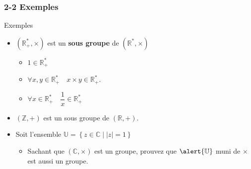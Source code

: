 \documentclass{beamer}
\begin{document}
\begin{frame}[<+->]
  \frametitle{2-2 Exemples}
 \begin{block}{Exemples}
   \begin{itemize}
     \item $\mathbf{\left(\mathbb{R}^{*}_+, \times\right)}$ est un \textbf{sous groupe}  de
       $\left(\mathbb{R}^{*}, \times\right)$
       \begin{itemize}
         \scriptsize
         \item $1 \in \mathbb{R}_+^{*}$\\[4pt]
         \item $\forall x,y \in \mathbb{R}^{*}_+\quad x\times y \in
           \mathbb{R}^{*}_+.$
         \item $\forall x \in \mathbb{R}_+^{*}\quad \dfrac{1}{x} \in
           \mathbb{R}^{*}_+$ \\[8pt]
       \end{itemize}
     \item $\mathbf{\left(\mathbb{Z}, +\right)}$ est un sous groupe de
       $\left(\mathbb{R}, +\right)$.
     \item Soit l'ensemble $\mathbb{U} = \left\{z\in\mathbb{C}\;|\; \vert z\vert
       = 1\right\}$\\[8pt]
       \begin{itemize}
         \item Sachant que $\left(\mathbb{C},\times \right)$ est un groupe,
           prouvez que $\alert{\mathbb{U}}$ muni de $\times$ est aussi un
           groupe.
       \end{itemize}
   \end{itemize} 
 \end{block} 

   \begin{figure}[htpb]
   \begin{center}
   \end{center}
   \end{figure}
\end{frame}
\end{document}
